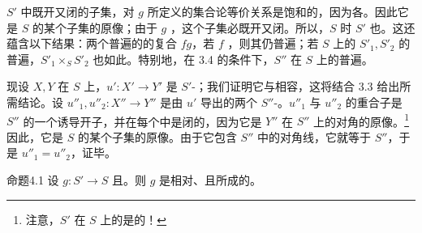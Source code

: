 $S'$ 中既开又闭的子集，对 $g$ 所定义的集合论等价关系是饱和的，因为各。因此它是 $S$ 的某个子集的原像；由于 $g$ ，这个子集必既开又闭。所以，$S$ 时 $S'$ 也。这还蕴含以下结果：两个普遍的的复合 $fg$，若 $f$ ，则其仍普遍；若 $S$ 上的 $S'_1,S'_2$ 的普遍，$S'_1\times_S S'_2$ 也如此。特别地，在 3.4 的条件下，$S''$ 在 $S$ 上的普遍。

现设 $X,Y$ 在 $S$ 上，$u':X'\to Y'$ 是 $S'$-；我们证明它与相容，这将结合 3.3 给出所需结论。设 $u''_1,u''_2:X''\to Y''$ 是由 $u'$ 导出的两个 $S''$-。$u''_1$ 与 $u''_2$ 的重合子是 $S''$ 的一个诱导开子，并在每个中是闭的，因为它是 $Y''$ 在 $S''$ 上的对角的原像。\footnote{注意，$S'$ 在 $S$ 上的是的！}因此，它是 $S$ 的某个子集的原像。由于它包含 $S''$ 中的对角线，它就等于 $S''$，于是 $u''_1=u''_2$，证毕。

\begin{SGAresult}{命题}{4.1}
设 $g:S'\to S$ 且。则 $g$ 是相对、且所成的。
\end{SGAresult}

